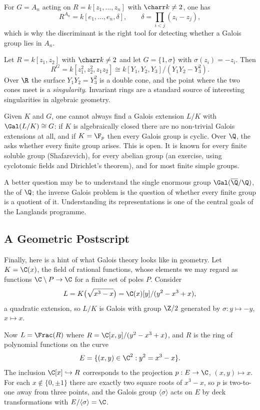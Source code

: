\begin{example}
	For $G = A_n$ acting on $R = k[z_1,\dots,z_n]$ with $\charr k \neq 2$, one has
	$$R^{A_n} = k[e_1,\dots,e_n,\delta], \qquad \delta = \prod_{i<j}(z_i-z_j),$$
	which is why the discriminant is the right tool for detecting whether a Galois group lies in $A_n$.
\end{example}

\begin{example}
	Let $R = k[z_1,z_2]$ with $\charr k \neq 2$ and let $G = \{1,\sigma\}$ with $\sigma(z_i)= -z_i$. Then
	$$R^G = k[z_1^2, z_2^2, z_1z_2]\cong k[Y_1,Y_2,Y_3]/(Y_1Y_2 - Y_3^2).$$
	Over $\R$ the surface $Y_1Y_2 = Y_3^2$ is a double cone, and the point where the two cones meet is a \emph{singularity}. Invariant rings are a standard source of interesting singularities in algebraic geometry.
\end{example}

Given $K$ and $G$, one cannot always find a Galois extension $L/K$ with $\Gal(L/K)\cong G$: if $K$ is algebraically closed there are no non-trivial Galois extensions at all, and if $K = \F_p$ then every Galois group is cyclic. Over $\Q$, the  asks whether every finite group arises. This is open. It is known for every finite soluble group (Shafarevich), for every abelian group (an exercise, using cyclotomic fields and Dirichlet's theorem), and for most finite simple groups.

A better question may be to understand the single enormous group $\Gal(\overline\Q/\Q)$, the  of $\Q$; the inverse Galois problem is the question of whether every finite group is a quotient of it. Understanding its representations is one of the central goals of the Langlands programme.

\subsection{A Geometric Postscript}

Finally, here is a hint of what Galois theory looks like in geometry. Let $K = \C(x)$, the field of rational functions, whose elements we may regard as functions $\C\setminus P \to \C$ for a finite set of poles $P$. Consider
$$L = K\big(\sqrt{x^3-x}\big) = \C(x)[y]/(y^2-x^3+x),$$
a quadratic extension, so $L/K$ is Galois with group $\Z/2$ generated by $\sigma : y \mapsto -y$, $x \mapsto x$.

Now $L = \Frac(R)$ where $R = \C[x,y]/(y^2-x^3+x)$, and $R$ is the ring of polynomial functions on the curve
$$E = \{(x,y)\in\C^2 : y^2 = x^3-x\}.$$
The inclusion $\C[x]\hookrightarrow R$ corresponds to the projection $p : E \to \C$, $(x,y)\mapsto x$. For each $x \notin\{0,\pm1\}$ there are exactly two square roots of $x^3-x$, so $p$ is two-to-one away from three points, and the Galois group $\langle\sigma\rangle$ acts on $E$ by deck transformations with $E/\langle\sigma\rangle = \C$.

